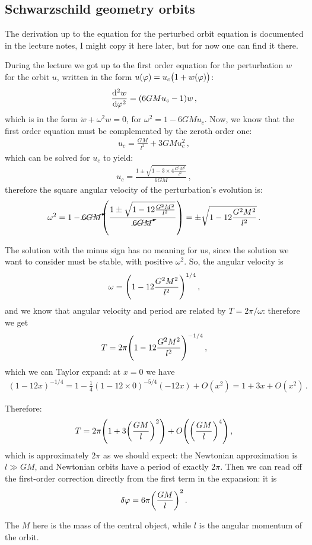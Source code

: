 \documentclass[main.tex]{subfiles}
\begin{document}
\subsection{Schwarzschild geometry orbits}

The derivation up to the equation for the perturbed orbit equation is documented in the lecture notes, I might copy it here later, but for now one can find it there.

During the lecture we got up to the first order equation for the perturbation \(w\) for the orbit \(u\), written in the form \(u(\varphi ) = u_{c} \qty(1+w(\varphi ))\): 
%
\begin{align}
    \dv[2]{w}{\varphi }  = (6GMu_c-1) w
\,,
\end{align}
%
which is in the form \(\ddot{w} + \omega^2 w = 0\), for \(\omega^2 = 1- 6GMu_c\). Now, we know that the first order equation must be complemented by the zeroth order one: 
%
\begin{align}
    u_c = \frac{GM}{l^2} + 3GM u_c^{2}
\,,
\end{align}
%
which can be solved for \(u_c\) to yield: 
%
\begin{align}
  u_c = \frac{1 \pm \sqrt{1 - 3 \times 4 \frac{G^2 M^2}{l^2}}}{6GM}
\,,
\end{align}
%
therefore the square angular velocity of the perturbation's evolution is: 
%
\begin{align}
  \omega^2 = 1 - \cancelto{}{6GM} \qty(\frac{1 \pm \sqrt{1 - 12 \frac{G^2 M^2}{l^2}}}{ \cancelto{}{6GM}})
  = \pm \sqrt{1 - 12 \frac{G^2 M^2}{l^2}}
\,.
\end{align}

The solution with the minus sign has no meaning for us, since the solution we want to consider must be stable, with positive \(\omega^2\). So, the angular velocity is 
%
\begin{align}
  \omega = \qty(1 - 12 \frac{G^2M^2}{l^2})^{1/4}
\,,
\end{align}
%
and we know that angular velocity and period are related by \(T = 2 \pi / \omega \): therefore we get 
%
\begin{align}
  T = 2 \pi \qty(1 - 12 \frac{G^2M^2}{l^2})^{-1/4}
\,,
\end{align}
%
which we can Taylor expand: at \(x=0\) we have 
%
\begin{align}
    (1-12x)^{-1/4} = 1 - \frac{1}{4} (1-12 \times 0)^{-5/4} (-12x) + O(x^2) = 1 + 3x + O(x^2 )
\,.
\end{align}
%

Therefore: 
%
\begin{align}
  T = 2 \pi \qty(1 + 3 \qty(\frac{GM}{l})^2) + O\qty(\qty(\frac{GM}{l})^{4})
\,,
\end{align}
%
which is approximately \(2 \pi \) as we should expect: the Newtonian approximation is \(l \gg GM\), and Newtonian orbits have a period of exactly \(2 \pi \). Then we can read off the first-order correction directly from the first term in the expansion: it is 
%
\begin{align}
  \delta \varphi = 6 \pi \qty(\frac{GM}{l})^2
\,.
\end{align}
%

The \(M\) here is the mass of the central object, while \(l\) is the angular momentum of the orbit. 
\end{document}
